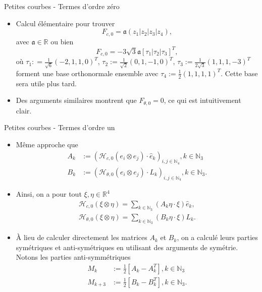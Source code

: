 \documentclass[10pt, envcountsect]{beamer}
\theoremstyle{plain}
\newcommand{\N}{\mathbb{N}}
\newcommand{\R}{\mathbb{R}}
\newcommand{\h}{\mathcal{H}}
\begin{document}
\begin{frame}{Petites courbes - Termes d'ordre zéro}
\begin{itemize}
\item Calcul élémentaire pour trouver 
\begin{equation}
	F_{c,0} = \mathfrak{a} (z_1 |z_2| z_3|z_4),
\end{equation}
avec $\mathfrak{a} \in \R$ ou bien
\begin{equation}
	F_{c,0} = - 3 \sqrt{3} \mathfrak{a} [\tau_1| \tau_2 |\tau_3]^T,
\end{equation}
où $\tau_1 : = \tfrac{1}{\sqrt{6}}(-2,1,1,0)^T$, $\tau_2 := \tfrac{1}{\sqrt{2}}(0,1,-1,0)^T$, $\tau_{3}:= \tfrac{1}{2 \sqrt{3}} (1,1,1,-3)^T$ forment une base orthonormale ensemble avec $\tau_4:= \tfrac{1}{2}(1,1,1,1)^T$. Cette base sera utile plus tard.
\item Des arguments similaires montrent que $F_{\theta, 0} = 0$, ce qui est intuitivement clair.
\end{itemize}
\end{frame}

\begin{frame}{Petites courbes - Termes d'ordre un}
\begin{itemize}
\item Même approche que \cite{Alouges2017}
\begin{align}
A_k &:= (\h_{c,0}(e_i \otimes e_j)\cdot \hat{e}_k)_{i,j \in \N_4}, k \in \N_3\\
B_k &:= (\h_{\theta,0}(e_i \otimes e_j)\cdot L_k)_{i,j \in \N_4}, k \in \N_3.
\end{align}

\item Ainsi, on a pour tout $\xi, \eta \in \R^4$
\begin{align}
\label{eq: matrix representation of spatial first order term}
	\h_{c,0}(\xi \otimes \eta) = \sum_{k \in \N_3}(A_k \eta \cdot \xi)\hat{e}_k, \\
\label{eq: matrix representation of angular first order term}
	\h_{\theta, 0}(\xi \otimes \eta) = \sum_{k \in \N_3}(B_k \eta \cdot \xi) L_k.
\end{align}

\item À lieu de calculer directement les matrices $A_k$ et $B_k$, on a calculé leurs parties symétriques et anti-symétriques en utilisant des arguments de symétrie. Notons les parties anti-symmétriques
\begin{align}
M_k &:= \frac{1}{2}[A_k - A_k^T], k \in \N_3\\
M_{k + 3} &:= \frac{1}{2}[B_k - B_k^T], k \in \N_3.
\end{align}

\end{itemize}
\end{frame}
\end{document}
